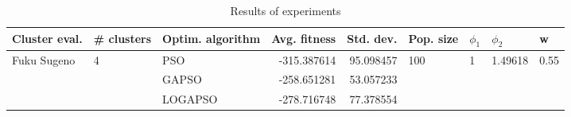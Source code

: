 \begin{table}
\centering
\caption{Results of experiments}
\begin{tabular}{lllrrllll}
\toprule
               Cluster eval. &        \# clusters & Optim. algorithm &  Avg. fitness &  Std. dev. &            Pop. size &         $\phi_{1}$ &               $\phi_{2}$ &                     w \\
\midrule
\multirow{3}{*}{Fuku Sugeno} & \multirow{3}{*}{4} &              PSO &   -315.387614 &  95.098457 & \multirow{3}{*}{100} & \multirow{3}{*}{1} & \multirow{3}{*}{1.49618} & \multirow{3}{*}{0.55} \\
                             &                    &            GAPSO &   -258.651281 &  53.057233 &                      &                    &                          &                       \\
                             &                    &          LOGAPSO &   -278.716748 &  77.378554 &                      &                    &                          &                       \\
\bottomrule
\end{tabular}
\end{table}
